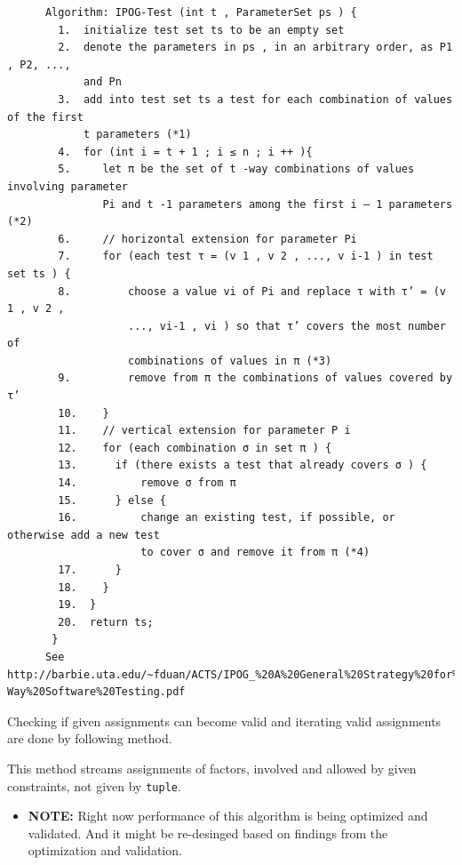\begin{verbatim}
      Algorithm: IPOG-Test (int t , ParameterSet ps ) {
        1.  initialize test set ts to be an empty set
        2.  denote the parameters in ps , in an arbitrary order, as P1 , P2, ...,
            and Pn
        3.  add into test set ts a test for each combination of values of the first
            t parameters (*1)
        4.  for (int i = t + 1 ; i ≤ n ; i ++ ){
        5.     let π be the set of t -way combinations of values involving parameter
               Pi and t -1 parameters among the first i – 1 parameters (*2)
        6.     // horizontal extension for parameter Pi
        7.     for (each test τ = (v 1 , v 2 , ..., v i-1 ) in test set ts ) {
        8.         choose a value vi of Pi and replace τ with τ’ = (v 1 , v 2 ,
                   ..., vi-1 , vi ) so that τ’ covers the most number of
                   combinations of values in π (*3)
        9.         remove from π the combinations of values covered by τ’
        10.    }
        11.    // vertical extension for parameter P i
        12.    for (each combination σ in set π ) {
        13.      if (there exists a test that already covers σ ) {
        14.          remove σ from π
        15.      } else {
        16.          change an existing test, if possible, or otherwise add a new test
                     to cover σ and remove it from π (*4)
        17.      }
        18.    }
        19.  }
        20.  return ts;
       }
      See http://barbie.uta.edu/~fduan/ACTS/IPOG_%20A%20General%20Strategy%20for%20T-Way%20Software%20Testing.pdf
\end{verbatim}

Checking if given assignments can become valid and iterating valid
assignments are done by following method.

\begin{Shaded}
\begin{Highlighting}[]

    \NormalTok{(}
  \NormalTok{) \{}
\end{Highlighting}
\end{Shaded}

This method streams assignments of factors, involved and allowed by
given constraints, not given by \texttt{tuple}.

\begin{itemize}
\tightlist
\item
  \textbf{NOTE:} Right now performance of this algorithm is being
  optimized and validated. And it might be re-desinged based on findings
  from the optimization and validation.
\end{itemize}

